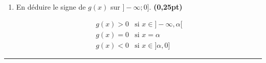 \documentclass[12pt,a4paper]{article}
\begin{document}
\begin{enumerate}
\begin{enumerate}
\textbf{Encadrement à $10^{-1}$ :}

\[
\boxed{-2{,}2 < \alpha < -2{,}1}
\]
        
        
    \end{enumerate}
    \item En déduire le signe de $g(x)$ sur $]-\infty; 0]$. \textbf{(0,25pt)}

\[
\begin{array}{ll}
g(x)>0 & \text{si } x\in ]-\infty,\alpha[ \\
g(x)=0 & \text{si } x=\alpha \\
g(x)<0 & \text{si } x\in ]\alpha,0]
\end{array}
\]    
    
\end{enumerate}

\hrule
\vskip 0.5cm
\end{document}
